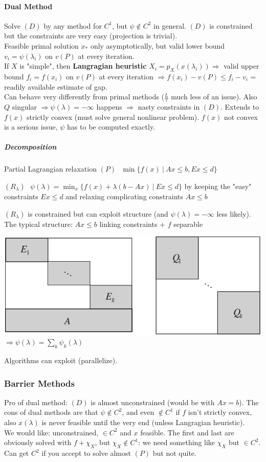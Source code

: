 \documentclass[10pt]{report}
\begin{document}
\paragraph{Dual Method} Solve $(D)$ by any method for $C^1$, but $\psi\not\in C^2$ in general. $(D)$ is constrained but the constraints are very easy (projection is trivial).\\
Feasible primal solution $x_*$ only asymptotically, but valid lower bound $v_i = \psi(\lambda_i)$ on $v(P)$ at every iteration.\\
If $X$ is "simple", then \textbf{Langragian heuristic} $X_i = p_X(x(\lambda_i))\Rightarrow$ valid upper bound $f_i = f(x_i)$ on $v(P)$ at every iteration $\Rightarrow f(x_i)-v(P)\leq f_i - v_i$ = readily available estimate of gap.\\
Can behave very differently from primal methods ($\frac{L}{\tau}$ much less of an issue). Also $Q$ singular $\Rightarrow \psi(\lambda)=-\infty$ happens $\Rightarrow$ nasty constraints in $(D)$. Extends to $f(x)$ strictly convex (must solve general nonlinear problem). $f(x)$ not convex is a serious issue, $\psi$ has to be computed exactly.
\subparagraph{Decomposition} Partial Lagrangian relaxation $(P)\:\:\:\min\{f(x)\:|\:Ax\leq b, Ex\leq d\}$\begin{list}{}{}
	\item $(R_\lambda)\:\:\:\psi(\lambda)=\min_x\{f(x)+\lambda(b-Ax)\:|\:Ex\leq d\}$ by keeping the "easy" constraints $Ex\leq d$ and relaxing complicating constraints $Ax\leq b$
\end{list}
$(R_\lambda)$ is constrained but can exploit structure (and $\psi(\lambda)=-\infty$ less likely). The typical structure: $Ax\leq b$ linking constraints + $f$ separable
\begin{center}
	\includegraphics[scale=0.6]{14.png}\\
	$\Rightarrow \psi(\lambda)=\sum_k \psi_k(\lambda)$
\end{center}
Algorithms can exploit (parallelize).
\subsubsection{Barrier Methods}
Pro of dual method: $(D)$ is almost unconstrained (would be with $Ax = b$). The cons of dual methods are that $\psi\not\in C^2$, and even $\not\in C^1$ if $f$ isn't strictly convex, also $x(\lambda)$ is never feasible until the very end (unless Langragian heuristic).\\
We would like: unconstrained, $\in C^2$ and $x$ feasible. The first and last are obviously solved with $f + \chi_X$, but $\chi_X\not\in C^1$: we need something like $\chi_X$ but $\in C^2$. Can get $C^2$ if you accept to solve almost $(P)$ but not quite.
\end{document}
